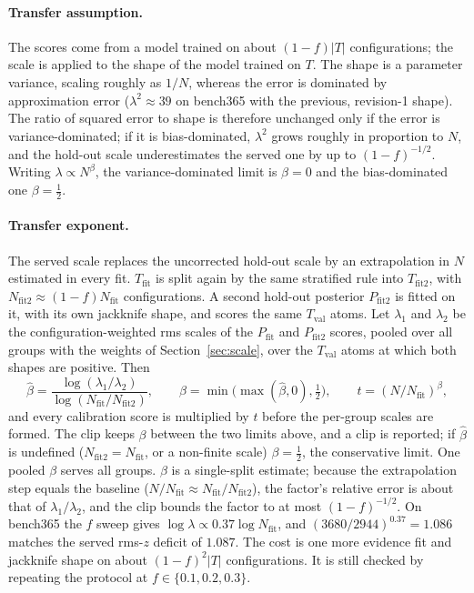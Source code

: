 \documentclass[11pt,a4paper]{article}
\begin{document}
\paragraph{Transfer assumption.} The scores come from a model trained on about $(1-f)|T|$
configurations; the scale is applied to the shape of the model trained on $T$. The shape is a
parameter variance, scaling roughly as $1/N$, whereas the error is dominated by approximation
error ($\lambda^2\approx39$ on bench365 with the previous, revision-1 shape). The ratio of squared error to shape is therefore
unchanged only if the error is variance-dominated; if it is bias-dominated, $\lambda^2$ grows
roughly in proportion to $N$, and the hold-out scale underestimates the served one by up to
$(1-f)^{-1/2}$. Writing $\lambda\propto N^{\beta}$, the variance-dominated limit is $\beta=0$ and
the bias-dominated one $\beta=\tfrac12$.

\paragraph{Transfer exponent.} The served scale replaces the uncorrected hold-out scale by an
extrapolation in $N$ estimated in every fit. $T_{\mathrm{fit}}$ is split again by the same
stratified rule into $T_{\mathrm{fit2}}$, with $N_{\mathrm{fit2}}\approx(1-f)N_{\mathrm{fit}}$
configurations. A second hold-out posterior $P_{\mathrm{fit2}}$ is fitted on it, with its own
jackknife shape, and scores the same $T_{\mathrm{val}}$ atoms. Let $\lambda_1$ and $\lambda_2$ be
the configuration-weighted rms scales of the $P_{\mathrm{fit}}$ and $P_{\mathrm{fit2}}$ scores,
pooled over all groups with the weights of Section~\ref{sec:scale}, over the $T_{\mathrm{val}}$ atoms
at which both shapes are positive. Then
\[
  \hat\beta=\frac{\log(\lambda_1/\lambda_2)}{\log(N_{\mathrm{fit}}/N_{\mathrm{fit2}})},\qquad
  \beta=\min\bigl(\max(\hat\beta,0),\tfrac12\bigr),\qquad
  t=(N/N_{\mathrm{fit}})^{\beta},
\]
and every calibration score is multiplied by $t$ before the per-group scales are formed. The clip
keeps $\beta$ between the two limits above, and a clip is reported; if $\hat\beta$ is undefined
($N_{\mathrm{fit2}}=N_{\mathrm{fit}}$, or a non-finite scale) $\beta=\tfrac12$, the conservative
limit. One pooled $\beta$ serves all groups. $\beta$ is a single-split estimate; because the
extrapolation step equals the baseline ($N/N_{\mathrm{fit}}\approx N_{\mathrm{fit}}/N_{\mathrm{fit2}}$),
the factor's relative error is about that of $\lambda_1/\lambda_2$, and the clip bounds the factor
to at most $(1-f)^{-1/2}$. On bench365 the $f$ sweep gives $\log\lambda\propto0.37\log N_{\mathrm{fit}}$, and
$(3680/2944)^{0.37}=1.086$ matches the served rms-$z$ deficit of $1.087$. The cost is one more evidence fit and jackknife
shape on about $(1-f)^2|T|$ configurations. It is still checked by repeating the protocol at
$f\in\{0.1,0.2,0.3\}$.
\end{document}
